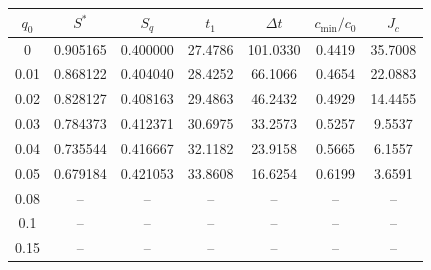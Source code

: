 \begin{tabular}{ccccccc}
\toprule
$q_0$ & $S^*$ & $S_q$ & $t_1$ & $\Delta t$ & $c_{\min}/c_0$ & $J_c$ \\
\midrule
0 & 0.905165 & 0.400000 & 27.4786 & 101.0330 & 0.4419 & 35.7008 \\
0.01 & 0.868122 & 0.404040 & 28.4252 & 66.1066 & 0.4654 & 22.0883 \\
0.02 & 0.828127 & 0.408163 & 29.4863 & 46.2432 & 0.4929 & 14.4455 \\
0.03 & 0.784373 & 0.412371 & 30.6975 & 33.2573 & 0.5257 & 9.5537 \\
0.04 & 0.735544 & 0.416667 & 32.1182 & 23.9158 & 0.5665 & 6.1557 \\
0.05 & 0.679184 & 0.421053 & 33.8608 & 16.6254 & 0.6199 & 3.6591 \\
0.08 & -- & -- & -- & -- & -- & -- \\
0.1 & -- & -- & -- & -- & -- & -- \\
0.15 & -- & -- & -- & -- & -- & -- \\
\bottomrule
\end{tabular}
